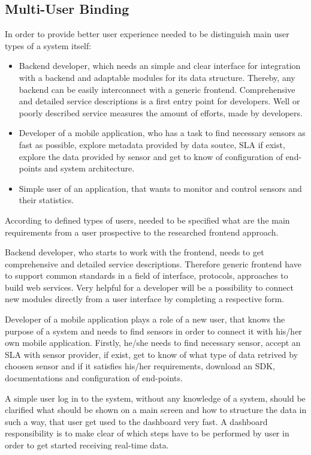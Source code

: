 \subsection {Multi-User Binding}
	In order to provide better user experience needed to be distinguish main user types of a system itself:
	\begin{itemize}
	\item Backend developer, which needs an simple and clear interface for integration with a backend and adaptable modules for its data structure. Thereby, any backend can be easily interconnect with a generic frontend. Comprehensive and detailed service descriptions is a first entry point for developers. Well or poorly described service measures the amount of efforts, made by developers. 
	\item Developer of a mobile application, who has a task to find necessary sensors as fast as possible, explore metadata provided by data soutce, SLA if exist, explore the data provided by sensor and get to know of configuration of end-points and system architecture.
	\item Simple user of an application, that wants to monitor and control sensors and their statistics.
	\end{itemize}
	According to defined types of users, needed to be specified what are the main requirements from a user prospective to the researched frontend approach.

	Backend developer, who starts to work with the frontend, needs to get comprehensive and detailed service descriptions. Therefore generic frontend have to support common standards in a field of interface, protocols, approaches to build web services. Very helpful for a developer will be a possibility to connect new modules directly from a user interface by completing a respective form.

	Developer of a mobile application plays a role of a new user, that knows the purpose of a system and needs to find sensors in order to connect it with his/her own mobile application. Firstly, he/she needs to find necessary sensor, accept an SLA with sensor provider, if exist, get to know of what type of data retrived by choosen sensor and if it satisfies his/her requirements, download an SDK, documentations and configuration of end-points.

	A simple user log in to the system, without any knowledge of a system, should be clarified what should be shown on a main screen and how to structure the data in such a way, that user get used to the dashboard very fast. A dashboard responsibility is to make clear of which steps have to be performed by user in order to get started receiving real-time data.

